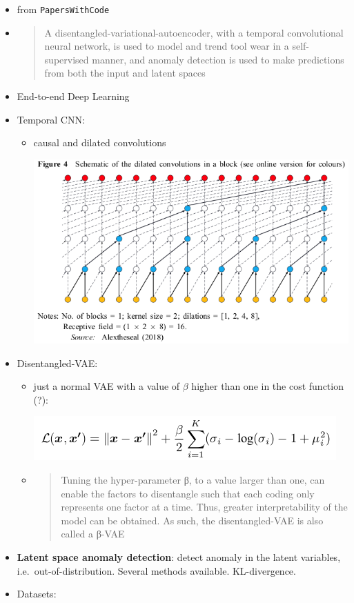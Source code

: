 \documentclass[
  letterpaper,
  DIV=11,
  numbers=noendperiod]{scrartcl}
\begin{document}
\begin{itemize}
\item
  from \texttt{PapersWithCode}
\item
  \begin{quote}
  A disentangled-variational-autoencoder, with a temporal convolutional
  neural network, is used to model and trend tool wear in a
  self-supervised manner, and anomaly detection is used to make
  predictions from both the input and latent spaces
  \end{quote}
\item
  End-to-end Deep Learning
\item
  Temporal CNN:

  \begin{itemize}
  \item
    causal and dilated convolutions

    \includegraphics{img/2023-01-12-11-17-38.png}
  \end{itemize}
\item
  Disentangled-VAE:

  \begin{itemize}
  \item
    just a normal VAE with a value of \(\beta\) higher than one in the
    cost function (?):

    \includegraphics{img/2023-01-12-11-23-14.png}
  \item
    \begin{quote}
    Tuning the hyper-parameter β, to a value larger than one, can enable
    the factors to disentangle such that each coding only represents one
    factor at a time. Thus, greater interpretability of the model can be
    obtained. As such, the disentangled-VAE is also called a β-VAE
    \end{quote}
  \end{itemize}
\item
  \textbf{Latent space anomaly detection}: detect anomaly in the latent
  variables, i.e.~out-of-distribution. Several methods available.
  KL-divergence.
\item
  Datasets:


\end{itemize}
\end{document}
